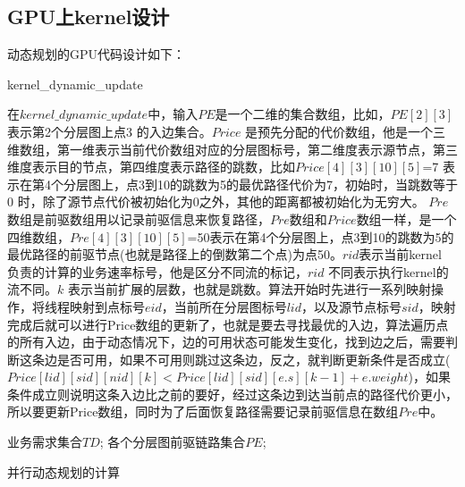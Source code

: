 \subsection{GPU上kernel设计}
动态规划的GPU代码设计如下：
\begin{algorithm}[t]
\begin{algorithmic}[1]
\EndIf
\EndIf
\EndFor
\EndFunction
\end{algorithmic}
\caption{kernel\_dynamic\_update}
\label{KernelDynamic}
\end{algorithm}
在$kernel\_dynamic\_update$中，输入$PE$是一个二维的集合数组，比如，$PE[2][3]$表示第2个分层图上点3 的入边集合。$Price$ 是预先分配的代价数组，他是一个三维数组，第一维表示当前代价数组对应的分层图标号，第二维度表示源节点，第三维度表示目的节点，第四维度表示路径的跳数，比如$Price[4][3][10][5]$=7 表示在第4个分层图上，点3到10的跳数为5的最优路径代价为7，初始时，当跳数等于0 时，除了源节点代价被初始化为0之外，其他的距离都被初始化为无穷大。
$Pre$数组是前驱数组用以记录前驱信息来恢复路径，$Pre$数组和$Price$数组一样，是一个四维数组，$Pre[4][3][10][5]$=50表示在第4个分层图上，点3到10的跳数为5的最优路径的前驱节点(也就是路径上的倒数第二个点)为点50。$rid$表示当前kernel 负责的计算的业务速率标号，他是区分不同流的标记，$rid$ 不同表示执行kernel的流不同。$k$ 表示当前扩展的层数，也就是跳数。算法开始时先进行一系列映射操作，将线程映射到点标号$eid$，当前所在分层图标号$lid$，以及源节点标号$sid$，映射完成后就可以进行Price数组的更新了，也就是要去寻找最优的入边，算法遍历点的所有入边，由于动态情况下，边的可用状态可能发生变化，找到边之后，需要判断这条边是否可用，如果不可用则跳过这条边，反之，就判断更新条件是否成立($Price[lid][sid][nid][k]<Price[lid][sid][e.s][k-1]+e.weight$)，如果条件成立则说明这条入边比之前的要好，经过这条边到达当前点的路径代价更小，所以要更新Price数组，同时为了后面恢复路径需要记录前驱信息在数组$Pre$中。
\begin{algorithm}[t]
\begin{algorithmic}[1]
\Require
业务需求集合$TD$;
各个分层图前驱链路集合$PE$;
\Else
{}
\EndIf
{}
\EndFor
\EndFor
\EndFor
\EndFor
{}
\EndFor
{}
\EndWhile
{}
\end{algorithmic}
\caption{{并行动态规划的计算}}
\label{ParaSPC}
\end{algorithm}

